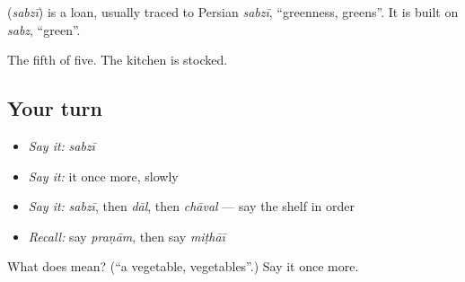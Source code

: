 \begin{cousinweb}
\textbf{} (\emph{sabzī}) is a loan, usually traced to Persian \emph{sabzī}, \textquotedblleft{}greenness, greens\textquotedblright{}. It is built on \emph{sabz}, \textquotedblleft{}green\textquotedblright{}.
\end{cousinweb}

\begin{grammarlens}[title={What you've built}]
The fifth of five. The kitchen is stocked.
\end{grammarlens}

\subsection*{Your turn}
\begin{itemize}
\raggedright
  \item \emph{Say it:} \emph{sabzī}
  \item \emph{Say it:} it once more, slowly
  \item \emph{Say it:} \emph{sabzī}, then \emph{dāl}, then \emph{chāval} — say the shelf in order
  \item \emph{Recall:} say \emph{praṇām}, then say \emph{miṭhāī}
\end{itemize}

\begin{tcolorbox}[breakable,colback=teal!4,colframe=teal!35!black,title={Before you move on}]
What does  mean? (\textquotedblleft{}a vegetable, vegetables\textquotedblright{}.) Say it once more.
\end{tcolorbox}
